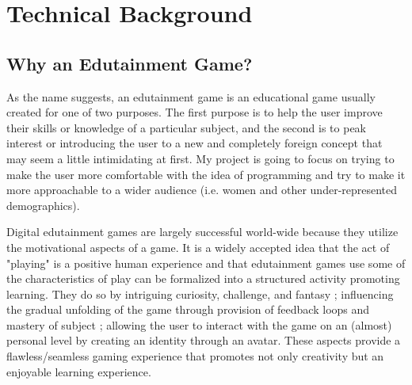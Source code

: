 \documentclass[10pt,twocolumn]{article}
\begin{document}
\section{Technical Background}

\subsection{Why an Edutainment Game?}
As the name suggests, an edutainment game is an educational game usually created for one of two purposes. The first purpose is to help the user improve their skills or knowledge of a particular subject, and the second is to peak interest or introducing the user to a new and completely foreign concept that may seem a little intimidating at first. My project is going to focus on trying to make the user more comfortable with the idea of programming and try to make it more approachable to a wider audience (i.e. women and other under-represented demographics).

Digital edutainment games are largely successful world-wide because they utilize the motivational aspects of a game. It is a widely accepted idea that the act of "playing" is a positive human experience and that edutainment games use some of the characteristics of play can be formalized into a structured activity promoting learning. \cite{dewey1910science} They do so by intriguing curiosity, challenge, and fantasy \cite{malone1981makes}; influencing the gradual unfolding of the game through provision of feedback loops and mastery of subject \cite{qin2009measuring}; allowing the user to interact with the game on an (almost) personal level by creating an identity through an avatar. \cite{blascovich2011infinite} These aspects provide a flawless/seamless gaming experience that promotes not only creativity but an enjoyable learning experience. 
\end{document}
